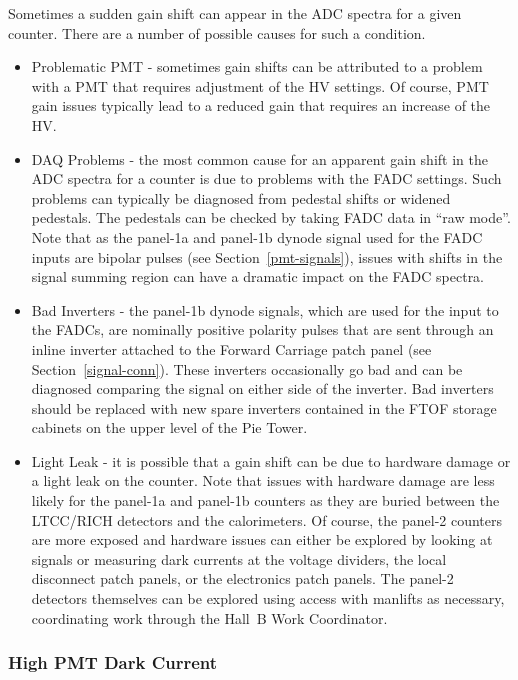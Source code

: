 \documentclass[letterpaper,10pt]{article}
\begin{document}
Sometimes a sudden gain shift can appear in the ADC spectra for a given counter. There are a number of
possible causes for such a condition.

\begin{itemize}
\item Problematic PMT - sometimes gain shifts can be attributed to a problem with a PMT that requires 
adjustment of the HV settings. Of course, PMT gain issues typically lead to a reduced gain that requires 
an increase of the HV. 
\item DAQ Problems - the most common cause for an apparent gain shift in the ADC spectra for a counter is 
due to problems with the FADC settings. Such problems can typically be diagnosed from pedestal shifts or 
widened pedestals. The pedestals can be checked by taking FADC data in ``raw mode''. Note that as the
panel-1a and panel-1b dynode signal used for the FADC inputs are bipolar pulses (see Section~\ref{pmt-signals}), 
issues with shifts in the signal summing region can have a dramatic impact on the FADC spectra. 
\item Bad Inverters - the panel-1b dynode signals, which are used for the input to the FADCs, are nominally
positive polarity pulses that are sent through an inline inverter attached to the Forward Carriage patch
panel (see Section~\ref{signal-conn}). These inverters occasionally go bad and can be diagnosed comparing 
the signal on either side of the inverter. Bad inverters should be replaced with new spare inverters 
contained in the FTOF storage cabinets on the upper level of the Pie Tower.
\item Light Leak - it is possible that a gain shift can be due to hardware damage or a light leak on the 
counter. Note that issues with hardware damage are less likely for the panel-1a and panel-1b counters as 
they are buried between the LTCC/RICH detectors and the calorimeters. Of course, the panel-2 counters are 
more exposed and hardware issues can either be explored by looking at signals or measuring dark currents 
at the voltage dividers, the local disconnect patch panels, or the electronics patch panels. The panel-2 
detectors themselves can be explored using access with manlifts as necessary, coordinating work through 
the Hall~B Work Coordinator.
\end{itemize}

\subsubsection{High PMT Dark Current}
\label{high-current}
\end{document}

